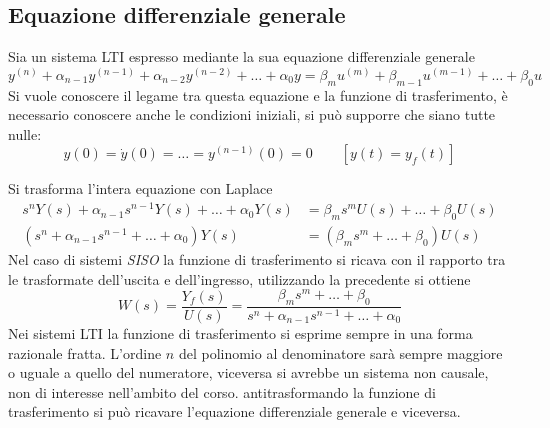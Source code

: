 
\subsection{Equazione differenziale generale}
Sia un sistema LTI espresso mediante la sua equazione differenziale generale
$$
y^{(n)} + \alpha_{n-1}y^{(n-1)} + \alpha_{n-2}y^{(n-2)} + \ldots +
\alpha_0 y = \beta_mu^{(m)}+ \beta_{m-1}u^{(m-1)} +
\ldots + \beta_0 u
$$
Si vuole conoscere il legame tra questa equazione e la funzione di
trasferimento, è necessario conoscere anche le condizioni iniziali, si può
supporre che siano tutte nulle:
$$
y(0) = \dot{y}(0) = \ldots = y^{(n-1)}(0) = 0 \qquad
[y(t)=y_f(t)]
$$

Si trasforma l'intera equazione con Laplace
$$\begin{aligned}
s^nY(s)+\alpha_{n-1}s^{n-1}Y(s) + \ldots + \alpha_0 Y(s) &= \beta_m s^m U(s) +
\ldots + \beta_0U(s)\\
\left(s^n+\alpha_{n-1}s^{n-1} + \ldots + \alpha_0 \right)Y(s) &= \left(\beta_m
s^m  +
\ldots + \beta_0\right)U(s)
\end{aligned}$$
Nel caso di sistemi \textit{SISO} la funzione di trasferimento si ricava con il
rapporto tra le trasformate dell'uscita e dell'ingresso, utilizzando la
precedente si ottiene
$$
W(s) = \frac{Y_f(s)}{U(s)} = \frac{\beta_m
s^m  +
\ldots + \beta_0}{s^n+\alpha_{n-1}s^{n-1} + \ldots +
\alpha_0}
$$
Nei sistemi LTI la funzione di trasferimento si esprime sempre in una forma
razionale fratta. L'ordine $n$ del polinomio al denominatore sarà sempre
maggiore o uguale a quello del numeratore, viceversa si avrebbe un sistema non
causale, non di interesse nell'ambito del corso.
antitrasformando la funzione di trasferimento si può ricavare l'equazione
differenziale generale e viceversa.

